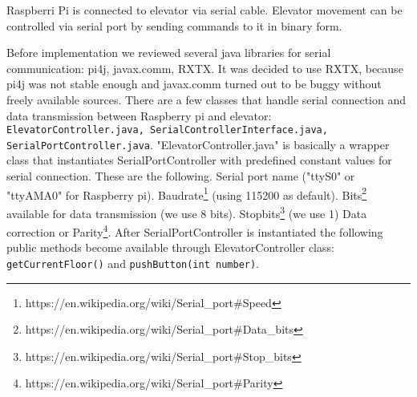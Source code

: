 Raspberri Pi is connected to elevator via serial cable.
Elevator movement can be controlled via serial port by sending commands to it in binary form.



Before implementation we reviewed several java libraries for serial communication: pi4j, javax.comm, RXTX.
It was decided to use RXTX, because pi4j was not stable enough and javax.comm turned out to be buggy without freely available sources.
There are a few classes that handle serial connection and data transmission between Raspberry pi and elevator: \texttt{ElevatorController.java, SerialControllerInterface.java, SerialPortController.java}.
"ElevatorController.java" is basically a wrapper class that instantiates SerialPortController with predefined constant values for serial connection.
These are the following.
Serial port name ("ttyS0" or "ttyAMA0" for Raspberry pi).
Baudrate\footnote{https://en.wikipedia.org/wiki/Serial_port#Speed} (using 115200 as default).
Bits\footnote{https://en.wikipedia.org/wiki/Serial_port#Data_bits} available for data transmission (we use 8 bits).
Stopbits\footnote{https://en.wikipedia.org/wiki/Serial_port#Stop_bits} (we use 1)
Data correction or Parity\footnote{https://en.wikipedia.org/wiki/Serial_port#Parity}.
After SerialPortController is instantiated the following public methods become available through ElevatorController class: \texttt{getCurrentFloor()} and \texttt{pushButton(int number)}.


